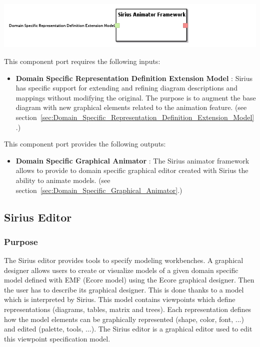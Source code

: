 \documentclass{gemoc} %
\begin{document}
\begin{center}
\includegraphics*[trim=0.0cm 0.0cm 0cm 0.0cm, clip=true]{../images/generated/Generated_Sirius_Animator_Framework.png}
\end{center}

This component port requires the following inputs:
\begin{itemize}
  \item \textbf{Domain Specific Representation Definition Extension Model} :
Sirius has specific support for extending and refining diagram descriptions and mappings without modifying the original. The purpose is to augment the base diagram with new graphical elements related to the animation feature.
(see section~\ref{sec:Domain_Specific_Representation_Definition_Extension_Model}.)
\end{itemize}

This component port provides the following outputs:
\begin{itemize}
  \item \textbf{Domain Specific Graphical Animator} :
The Sirius animator framework allows to provide to domain specific graphical editor created with Sirius the ability to animate models.
(see section~\ref{sec:Domain_Specific_Graphical_Animator}.)
\end{itemize}


\subsection{Sirius Editor}
\label{sec:Sirius_Editor}

\subsubsection{Purpose}
The Sirius editor provides tools to specify modeling workbenches. A graphical designer allows users to create or visualize models of a given domain specific model defined with EMF (Ecore model) using the Ecore graphical designer. Then the user has to describe its graphical designer. This is done thanks to a model which is interpreted by Sirius. This model contains viewpoints which define representations (diagrams, tables, matrix and trees). Each representation defines how the model elements can be graphically represented (shape, color, font, ...) and edited (palette, tools, ...).
The Sirius editor is a graphical editor used to edit this viewpoint specification model.
\end{document}
